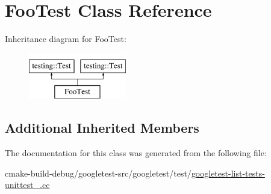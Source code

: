 \hypertarget{classFooTest}{}\section{Foo\+Test Class Reference}
\label{classFooTest}
Inheritance diagram for Foo\+Test\+:\begin{figure}[H]
\begin{center}
\leavevmode
\includegraphics[height=2.000000cm]{classFooTest}
\end{center}
\end{figure}
\subsection*{Additional Inherited Members}


The documentation for this class was generated from the following file\+:\begin{DoxyCompactItemize}
\item 
cmake-\/build-\/debug/googletest-\/src/googletest/test/\mbox{\hyperlink{googletest-list-tests-unittest___8cc}{googletest-\/list-\/tests-\/unittest\+\_\+.\+cc}}\end{DoxyCompactItemize}
